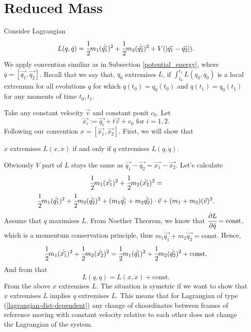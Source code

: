 \documentclass[main.tex]{subfiles}
\begin{document}
\section{Reduced Mass}
Consider Lagrangian
\begin{equation}
\label{lagrangian-dist-dependent}
L(q, \dot{q}) = \cfrac{1}{2}m_1 (\dot{\vec{q_1}})^2 + \cfrac{1}{2}m_2 (\dot{\vec{q_2}})^2 + V(|\vec{q_1} - \vec{q_2}|).
\end{equation}
We apply convention similiar as in Subsection \ref{potential_energy}, where $q=[\vec{q_1}, \vec{q_2}]$.
Recall that we say that, $q_0$ extremises $L$, if $\int_{t_0}^{t_1} L(q_0, \dot{q_0})$ is a local extremum for all evolutions $q$ for which $q(t_0) = q_0(t_0)$ and $q(t_1) = q_0(t_1)$ for any moments of time $t_0, t_1$.

Take any constant velocity $\vec{v}$ and constant ponit $c_0$. Let
\begin{equation}
\label{inertial-coordinates-change}
\vec{x_i} := \vec{q_i} + t\vec{v} + c_0 \text{ for } i=1,2.
\end{equation}
Following our convention $x=[\vec{x_1}, \vec{x_2}]$. First, we will show that 
\begin{fact}
$x$ extremises $L(x, \dot{x})$ if and only if $q$ extremises $L(q, \dot{q})$.
\end{fact}

Obviously $V$ part of $L$ stays the same as $\vec{q_1} - \vec{q_2} = \vec{x_1} - \vec{x_2}$. Let's calculate
\begin{multline}
\cfrac{1}{2}m_1 (\dot{\vec{x_1}})^2 + \cfrac{1}{2}m_2 (\dot{\vec{x_2}})^2 = \\
\cfrac{1}{2}m_1 (\dot{\vec{q_1}})^2 + \cfrac{1}{2}m_2 (\dot{\vec{q_2}})^2 + (m_1\dot{\vec{q_1}} + m_2\dot{\vec{q_2}})\cdot \vec{v} + (m_1 + m_2)(\vec{v})^2.
\end{multline}
Assume that $q$ maximises $L$. From Noether Theorem, we know that $\cfrac{\partial L}{\partial \dot{q}} = \text{const}$, which is a momentum conservation principle, thus $m_1\dot{\vec{q_1}} + m_2\dot{\vec{q_2}}=\text{const}$. Hence,
\begin{equation}
\cfrac{1}{2}m_1 (\dot{\vec{x_1}})^2 + \cfrac{1}{2}m_2 (\dot{\vec{x_2}})^2 = \cfrac{1}{2}m_1 (\dot{\vec{q_1}})^2 + \cfrac{1}{2}m_2 (\dot{\vec{q_2}})^2 + \text{const}.
\end{equation}
And from that 
\begin{equation}
L(q,\dot{q}) = L(x,\dot{x}) + \text{const}.
\end{equation}
From the above $x$ extremises $L$. The situation is symetric if we want to show that $x$ extremises $L$ implies $q$ extremises $L$.
This means that for Lagrangian of type (\ref{lagrangian-dist-dependent}) any change of choordinates between frames of reference moving with constant velocity relative to each other does not change the Lagrangian of the system.
\end{document}

